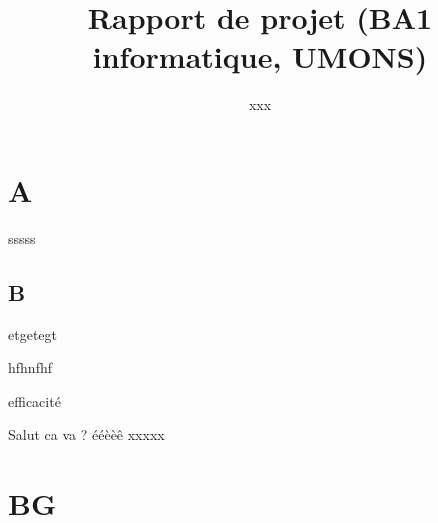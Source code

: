 \documentclass[10pt]{article}
\title{Rapport de projet (BA1 informatique, UMONS)}
\author{xxx}
\begin{document}
\maketitle
\tableofcontents
\newpage

\section{A}

sssss

\subsection{B}

etgetegt

hfhnfhf

efficacité

Salut ca va ? ééèèê
xxxxx

\section{BG}
\end{document}
